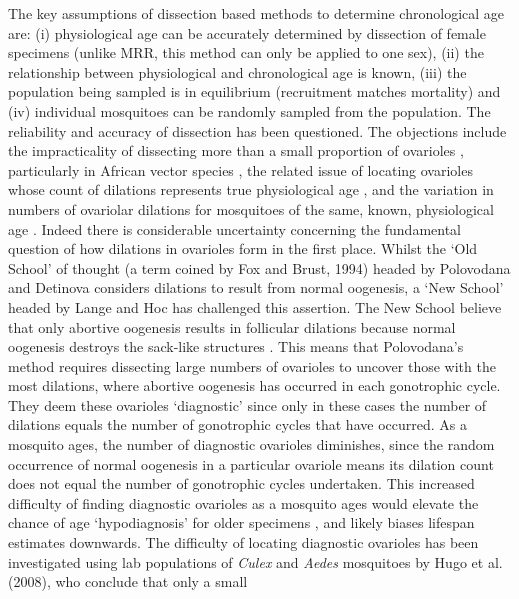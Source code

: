 \documentclass[]{article}
\begin{document}
The key assumptions of dissection based methods to determine
chronological age are: (i) physiological age can be accurately
determined by dissection of female specimens (unlike MRR, this method
can only be applied to one sex), (ii) the relationship between
physiological and chronological age is known, (iii) the population being
sampled is in equilibrium (recruitment matches mortality) and (iv)
individual mosquitoes can be randomly sampled from the population. The
reliability and accuracy of dissection has been questioned. The
objections include the impracticality of dissecting more than a small
proportion of ovarioles \citep{hoc1995ovariole}, particularly in African
vector species \citep{gillies1965study}, the related issue of locating
ovarioles whose count of dilations represents true physiological age
\citep{fox1994dilatations}, and the variation in numbers of ovariolar
dilations for mosquitoes of the same, known, physiological age \citep{kay1979age,russell1986population,hugo2008evaluations}. Indeed there is considerable
uncertainty concerning the fundamental question of how dilations in
ovarioles form in the first place. Whilst the `Old School' of thought (a
term coined by Fox and Brust, 1994) headed by Polovodana \citep{polovodova1949determination} and Detinova \citep{detinova1962age} considers dilations to result from
normal oogenesis, a `New School' headed by Lange and Hoc \citep{lange1981abortive} has challenged this assertion. The New School believe that only
abortive oogenesis results in follicular dilations because normal
oogenesis destroys the sack-like structures \citep{fox1994dilatations}. This
means that Polovodana's method requires dissecting large numbers of
ovarioles to uncover those with the most dilations, where abortive
oogenesis has occurred in each gonotrophic cycle. They deem these
ovarioles `diagnostic' since only in these cases the number of dilations
equals the number of gonotrophic cycles that have occurred. As a
mosquito ages, the number of diagnostic ovarioles diminishes, since the
random occurrence of normal oogenesis in a particular ovariole means its
dilation count does not equal the number of gonotrophic cycles
undertaken. This increased difficulty of finding diagnostic ovarioles as
a mosquito ages would elevate the chance of age `hypodiagnosis' for
older specimens \citep{fox1994dilatations}, and likely biases lifespan
estimates downwards. The difficulty of locating diagnostic ovarioles has
been investigated using lab populations of \emph{Culex} and \emph{Aedes}
mosquitoes by Hugo et al. (2008), who conclude that only a small
\end{document}
